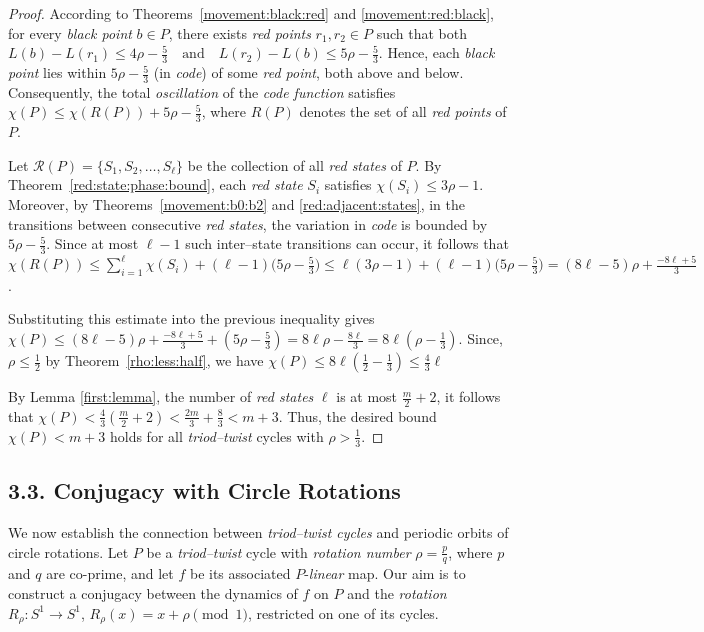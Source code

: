 \documentclass[12pt,reqno]{amsart}
\theoremstyle{definition}
\theoremstyle{remark}
\theoremstyle{assumption}
\numberwithin{equation}{section}
\begin{document}
\begin{proof}
	According to Theorems~\ref{movement:black:red} and \ref{movement:red:black}, for every \emph{black point} $b \in P$, there exists \emph{red points} $r_1, r_2 \in P$ such that both 	$L(b) - L(r_1) \leqslant 4\rho - \tfrac{5}{3} \quad \text{and} \quad 	L(r_2) - L(b) \leqslant 5\rho - \tfrac{5}{3}$. 
	Hence, each \emph{black point} lies within $5\rho - \tfrac{5}{3}$ (in \emph{code}) of some \emph{red point}, both above and below.  	Consequently, the total \emph{oscillation} of the \emph{code function} satisfies $\chi(P) \leqslant  \chi(R(P)) + 5\rho - \tfrac{5}{3}$, where $R(P)$ denotes the set of all \emph{red points} of $P$.
	
	Let $\mathcal{R}(P) = \{S_1, S_2, \ldots, S_\ell\}$ be the collection of all \emph{red states} of $P$.  
	By Theorem~\ref{red:state:phase:bound}, each \emph{red state} $S_i$ satisfies $\chi(S_i) \leqslant  3\rho - 1$. Moreover, by Theorems~\ref{movement:b0:b2} and \ref{red:adjacent:states}, in the transitions between consecutive \emph{red states}, the variation in \emph{code} is bounded by $5\rho - \tfrac{5}{3}$.  	Since at most $\ell - 1$ such inter–state transitions can occur, it follows that $\chi(R(P)) \leqslant \sum_{i=1}^{\ell} \chi(S_i) + (\ell - 1)\Big(5\rho - \tfrac{5}{3}\Big) \leqslant  \ell(3\rho - 1) + (\ell - 1)\Big(5\rho - \tfrac{5}{3}\Big) = (8\ell - 5)\rho + \tfrac{-8\ell + 5}{3}$. 
	
	Substituting this estimate into the previous inequality gives $	\chi(P) \leqslant (8\ell - 5)\rho + \tfrac{-8\ell + 5}{3} + (5\rho - \tfrac{5}{3}) 	= 8\ell\rho - \tfrac{8\ell}{3} = 8 \ell (\rho - \frac{1}{3}).$ 	Since,  $\rho \leqslant \tfrac{1}{2}$ by Theorem~\ref{rho:less:half}, we have $\chi(P) \leqslant 8 \ell (\frac{1}{2} - \frac{1}{3})
	\leqslant \tfrac{4}{3}\ell$ 
	
	By Lemma \ref{first:lemma},  the number of \emph{red states} $\ell$ is at most $\frac{m}{2} + 2$, it follows that $\chi(P) < \tfrac{4}{3}(\frac{m}{2} + 2) <  \frac{2m}{3}+ \frac{8}{3} <  m+3$. Thus, the desired bound $\chi(P) < m + 3$ holds for all \emph{triod–twist} cycles with $\rho > \tfrac{1}{3}$.
\end{proof}



\subsection*{3.3. Conjugacy with Circle Rotations}

We now establish the connection between \emph{triod–twist cycles} and
periodic orbits of circle rotations. Let $P$ be a \emph{triod–twist} cycle with \emph{rotation number} $\rho=\tfrac pq$, where $p$ and $q$ are co-prime, and let $f$ be its associated $P$-\emph{linear} map.
Our aim is to construct a conjugacy between the dynamics of $f$ on $P$
and the \emph{rotation} $R_\rho\colon S^1\to S^1$, $R_\rho(x)=x+\rho\pmod1$, restricted on one of its cycles. 
\end{document}
